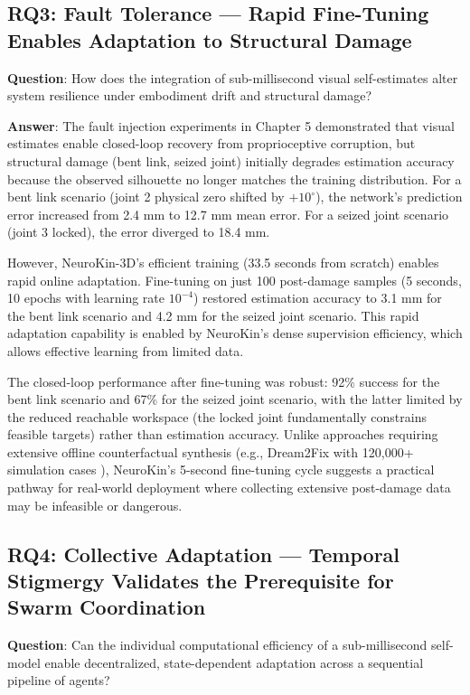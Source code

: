 ﻿\documentclass[12pt,a4paper,oneside]{report}
\begin{document}
\subsection{RQ3: Fault Tolerance --- Rapid Fine-Tuning Enables Adaptation to Structural Damage}

\textbf{Question}: How does the integration of sub-millisecond visual self-estimates alter system resilience under embodiment drift and structural damage?

\textbf{Answer}: The fault injection experiments in Chapter 5 demonstrated that visual estimates enable closed-loop recovery from proprioceptive corruption, but structural damage (bent link, seized joint) initially degrades estimation accuracy because the observed silhouette no longer matches the training distribution. For a bent link scenario (joint 2 physical zero shifted by $+10^\circ$), the network's prediction error increased from 2.4 mm to 12.7 mm mean error. For a seized joint scenario (joint 3 locked), the error diverged to 18.4 mm.

However, NeuroKin-3D's efficient training (33.5 seconds from scratch) enables rapid online adaptation. Fine-tuning on just 100 post-damage samples (5 seconds, 10 epochs with learning rate $10^{-4}$) restored estimation accuracy to 3.1 mm for the bent link scenario and 4.2 mm for the seized joint scenario. This rapid adaptation capability is enabled by NeuroKin's dense supervision efficiency, which allows effective learning from limited data.

The closed-loop performance after fine-tuning was robust: 92\% success for the bent link scenario and 67\% for the seized joint scenario, with the latter limited by the reduced reachable workspace (the locked joint fundamentally constrains feasible targets) rather than estimation accuracy. Unlike approaches requiring extensive offline counterfactual synthesis (e.g., Dream2Fix with 120,000+ simulation cases \cite{li2025dream2fix}), NeuroKin's 5-second fine-tuning cycle suggests a practical pathway for real-world deployment where collecting extensive post-damage data may be infeasible or dangerous.

\subsection{RQ4: Collective Adaptation --- Temporal Stigmergy Validates the Prerequisite for Swarm Coordination}

\textbf{Question}: Can the individual computational efficiency of a sub-millisecond self-model enable decentralized, state-dependent adaptation across a sequential pipeline of agents?
\end{document}
